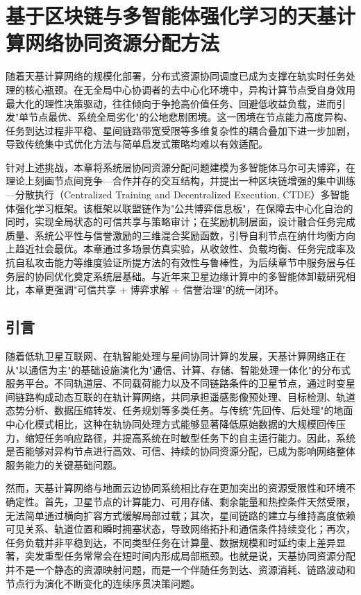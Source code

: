 
\chapter{基于区块链与多智能体强化学习的天基计算网络协同资源分配方法}
\label{chap:ch3}

随着天基计算网络的规模化部署，分布式资源协同调度已成为支撑在轨实时任务处理的核心瓶颈。在无全局中心协调者的去中心化环境中，异构计算节点受自身效用最大化的理性决策驱动，往往倾向于争抢高价值任务、回避低收益负载，进而引发"单节点最优、系统全局劣化"的公地悲剧困境。这一困境在节点能力高度异构、任务到达过程非平稳、星间链路带宽受限等多维复杂性的耦合叠加下进一步加剧，导致传统集中式优化方法与简单启发式策略均难以有效适配。

针对上述挑战，本章将系统层协同资源分配问题建模为多智能体马尔可夫博弈，在理论上刻画节点间竞争—合作并存的交互结构，并提出一种区块链增强的集中训练—分散执行（Centralized Training and Decentralized Execution, CTDE）多智能体强化学习框架。该框架以联盟链作为"公共博弈信息板"，在保障去中心化自治的同时，实现全局状态的可信共享与策略审计；在奖励机制层面，设计融合任务完成质量、系统公平性与信誉激励的三维混合奖励函数，引导自利节点在纳什均衡方向上趋近社会最优。本章通过多场景仿真实验，从收敛性、负载均衡、任务完成率及抗自私攻击能力等维度验证所提方法的有效性与鲁棒性，为后续章节中服务层与任务层的协同优化奠定系统层基础。与近年来卫星边缘计算中的多智能体卸载研究相比，本章更强调"可信共享 + 博弈求解 + 信誉治理"的统一闭环\cite{ref1,ref2,ref3}。

\section{引言}

随着低轨卫星互联网、在轨智能处理与星间协同计算的发展，天基计算网络正在从"以通信为主"的基础设施演化为"通信、计算、存储、智能处理一体化"的分布式服务平台。不同轨道层、不同载荷能力以及不同链路条件的卫星节点，通过时变星间链路构成动态互联的在轨计算网络，共同承担遥感影像预处理、目标检测、轨道态势分析、数据压缩转发、任务规划等多类任务。与传统"先回传、后处理"的地面中心化模式相比，这种在轨协同处理方式能够显著降低原始数据的大规模回传压力，缩短任务响应路径，并提高系统在时敏型任务下的自主运行能力。因此，系统是否能够对异构节点进行高效、可信、持续的协同资源分配，已成为影响网络整体服务能力的关键基础问题。

然而，天基计算网络与地面云边协同系统相比存在更加突出的资源受限性和环境不确定性。首先，卫星节点的计算能力、可用存储、剩余能量和热控条件天然受限，无法简单通过横向扩容方式缓解局部过载；其次，星间链路的建立与维持高度依赖可见关系、轨道位置和瞬时拥塞状态，导致网络拓扑和通信条件持续变化；再次，任务负载并非平稳到达，不同类型任务在计算量、数据规模和时延约束上差异显著，突发重型任务常常会在短时间内形成局部瓶颈。也就是说，天基协同资源分配并不是一个静态的资源映射问题，而是一个伴随任务到达、资源消耗、链路波动和节点行为演化不断变化的连续序贯决策问题。

